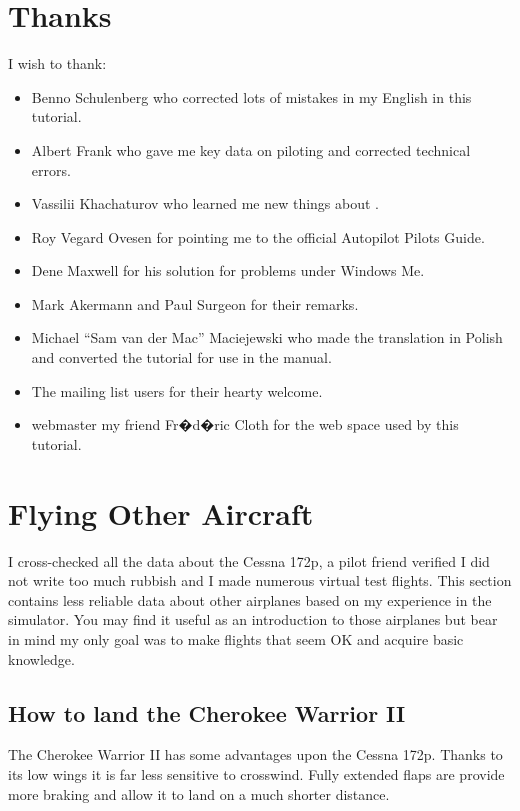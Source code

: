 \section{Thanks}

I wish to thank:
\begin{itemize}
    \item Benno Schulenberg who corrected lots of mistakes in my English in this
  tutorial.
    \item Albert Frank who gave me key data on piloting and corrected technical
  errors.
    \item Vassilii Khachaturov who learned me new things about \FlightGear.
    \item Roy Vegard Ovesen for pointing me to the official Autopilot Pilots Guide.
    \item Dene Maxwell for his solution for problems under Windows Me.
    \item Mark Akermann and Paul Surgeon for their remarks.
    \item Michael ``Sam van der Mac'' Maciejewski who made the translation in
  Polish and converted the tutorial for use in the manual.
    \item The \FlightGear{} mailing list users for their hearty welcome.
  \item {} webmaster my friend Fr�d�ric Cloth for
  the web space used by this tutorial.
\end{itemize}

\section{Flying Other Aircraft}

I cross-checked all the data about the Cessna 172p, a pilot friend verified I
did not write too much rubbish and I made numerous virtual test flights. This
section contains less reliable data about other airplanes based on my experience
in the simulator. You may find it useful as an introduction to those airplanes
but bear in mind my only goal was to make flights that seem OK and acquire basic
knowledge.

\subsection{How to land the Cherokee Warrior II}
\label{sec:Cherokee}

The Cherokee Warrior II has some advantages upon the Cessna 172p. Thanks to its
low wings it is far less sensitive to crosswind. Fully extended flaps are provide
more braking and allow it to land on a much shorter distance.

